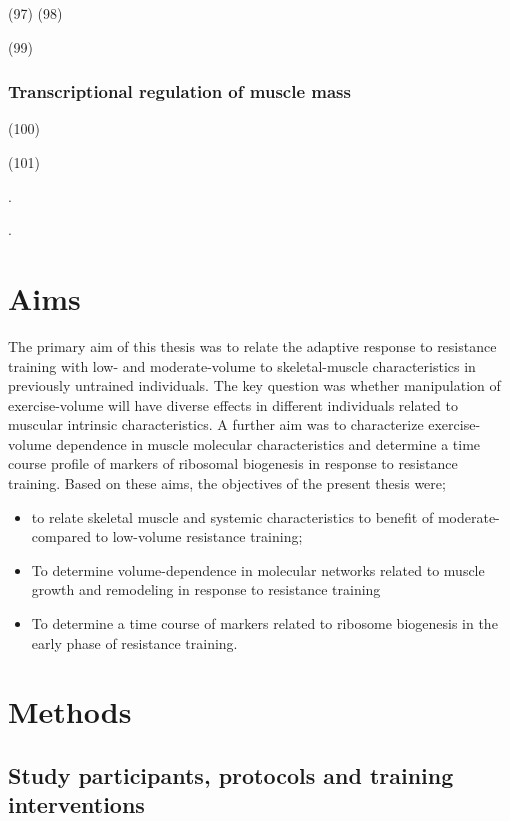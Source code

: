 \documentclass[twoside,10pt]{gihclass} %
\providecommand{\tightlist}{%
  \setlength{\itemsep}{0pt}\setlength{\parskip}{0pt}}
\begin{document}
(97)
(98)

(99)

\hypertarget{transcriptional-regulation-of-muscle-mass}{%
\subsection{Transcriptional regulation of muscle mass}\label{transcriptional-regulation-of-muscle-mass}}

(100)

(101)

.

.

\hypertarget{aims}{%
\chapter{Aims}\label{aims}}

The primary aim of this thesis was to relate the adaptive response to resistance training with low- and moderate-volume to skeletal-muscle characteristics in previously untrained individuals. The key question was whether manipulation of exercise-volume will have diverse effects in different individuals related to muscular intrinsic characteristics. A further aim was to characterize exercise-volume dependence in muscle molecular characteristics and determine a time course profile of markers of ribosomal biogenesis in response to resistance training. Based on these aims, the objectives of the present thesis were;
\begin{itemize}
\tightlist
\item
  to relate skeletal muscle and systemic characteristics to benefit of moderate- compared to low-volume resistance training;
\item
  To determine volume-dependence in molecular networks related to muscle growth and remodeling in response to resistance training
\item
  To determine a time course of markers related to ribosome biogenesis in the early phase of resistance training.
\end{itemize}
\hypertarget{methods}{%
\chapter{Methods}\label{methods}}

\hypertarget{study-participants-protocols-and-training-interventions}{%
\section{Study participants, protocols and training interventions}\label{study-participants-protocols-and-training-interventions}}
\end{document}

